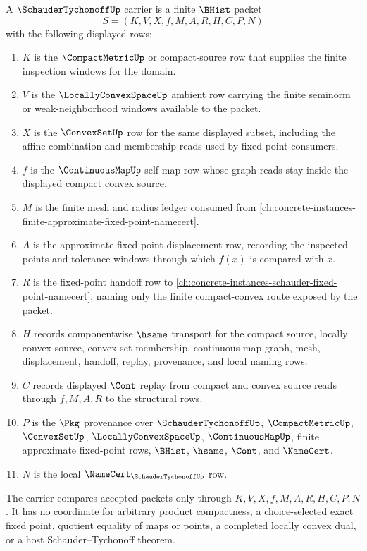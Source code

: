 \begin{definition}
\label{def:schauder-tychonoff-carrier}
A $\SchauderTychonoffUp$ carrier is a finite $\BHist$ packet
$$
S=(K,V,X,f,M,A,R,H,C,P,N)
$$
with the following displayed rows:
\begin{enumerate}
\item $K$ is the $\CompactMetricUp$ or compact-source row that supplies the finite inspection windows for the domain.
\item $V$ is the $\LocallyConvexSpaceUp$ ambient row carrying the finite seminorm or weak-neighborhood windows available to the packet.
\item $X$ is the $\ConvexSetUp$ row for the same displayed subset, including the affine-combination and membership reads used by fixed-point consumers.
\item $f$ is the $\ContinuousMapUp$ self-map row whose graph reads stay inside the displayed compact convex source.
\item $M$ is the finite mesh and radius ledger consumed from \autoref{ch:concrete-instances-finite-approximate-fixed-point-namecert}.
\item $A$ is the approximate fixed-point displacement row, recording the inspected points and tolerance windows through which $f(x)$ is compared with $x$.
\item $R$ is the fixed-point handoff row to \autoref{ch:concrete-instances-schauder-fixed-point-namecert}, naming only the finite compact-convex route exposed by the packet.
\item $H$ records componentwise $\hsame$ transport for the compact source, locally convex source, convex-set membership, continuous-map graph, mesh, displacement, handoff, replay, provenance, and local naming rows.
\item $C$ records displayed $\Cont$ replay from compact and convex source reads through $f,M,A,R$ to the structural rows.
\item $P$ is the $\Pkg$ provenance over $\SchauderTychonoffUp$, $\CompactMetricUp$, $\ConvexSetUp$, $\LocallyConvexSpaceUp$, $\ContinuousMapUp$, finite approximate fixed-point rows, $\BHist$, $\hsame$, $\Cont$, and $\NameCert$.
\item $N$ is the local $\NameCert_{\SchauderTychonoffUp}$ row.
\end{enumerate}
The carrier compares accepted packets only through $K,V,X,f,M,A,R,H,C,P,N$. It has no coordinate for arbitrary product compactness, a choice-selected exact fixed point, quotient equality of maps or points, a completed locally convex dual, or a host Schauder--Tychonoff theorem.
\end{definition}

